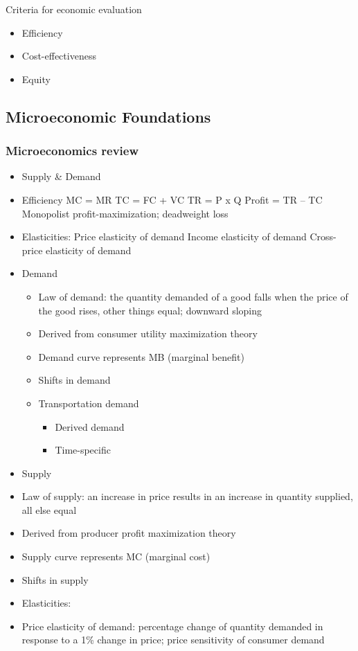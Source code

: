 \documentclass[]{article}
\begin{document}
Criteria for economic evaluation

\begin{itemize}
\item
  Efficiency
\item
  Cost-effectiveness
\item
  Equity
\end{itemize}

\hypertarget{microeconomic-foundations}{%
\subsection{Microeconomic Foundations}\label{microeconomic-foundations}}

\hypertarget{microeconomics-review}{%
\subsubsection{Microeconomics review}\label{microeconomics-review}}

\begin{itemize}
\item
  Supply \& Demand
\item
  Efficiency MC = MR TC = FC + VC TR = P x Q Profit = TR -- TC
  Monopolist profit-maximization; deadweight loss
\item
  Elasticities: Price elasticity of demand Income elasticity of demand
  Cross-price elasticity of demand
\item
  Demand

  \begin{itemize}
  \item
    Law of demand: the quantity demanded of a good falls when the price
    of the good rises, other things equal; downward sloping
  \item
    Derived from consumer utility maximization theory
  \item
    Demand curve represents MB (marginal benefit)
  \item
    Shifts in demand
  \item
    Transportation demand

    \begin{itemize}
    \item
      Derived demand
    \item
      Time-specific
    \end{itemize}
  \end{itemize}
\item
  Supply
\item
  Law of supply: an increase in price results in an increase in quantity
  supplied, all else equal
\item
  Derived from producer profit maximization theory
\item
  Supply curve represents MC (marginal cost)
\item
  Shifts in supply
\item
  Elasticities:
\item
  Price elasticity of demand: percentage change of quantity demanded in
  response to a 1\% change in price; price sensitivity of consumer
  demand
\end{itemize}
\end{document}
